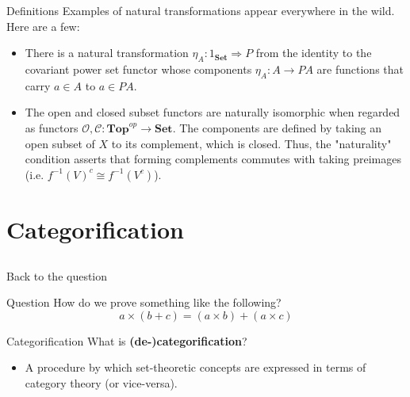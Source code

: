 \documentclass[tikz]{beamer}
\theoremstyle{definition}
\begin{document}
\begin{frame}{Definitions}
    Examples of natural transformations appear everywhere in the wild. Here are a few: 
    
    \begin{itemize}
        \item There is a natural transformation $\eta_A : 1_{\mathbf{Set}} \Rightarrow P$ from the identity to the covariant power set functor whose components $\eta_A : A \to PA$ are functions that carry $a \in A$ to ${a} \in PA$.
        
        \item The open and closed subset functors are naturally isomorphic when regarded as functors $\mathcal{O},\mathcal{C}: \mathbf{Top}^{op} \to \mathbf{Set}$. The components are defined by taking an open subset of $X$ to its complement, which is closed. Thus, the "naturality" condition asserts that forming complements commutes with taking preimages (i.e. $f^{-1}(V)^c \cong f^{-1}(V^c)$).
    \end{itemize}{}
\end{frame}{}

\section{Categorification}
\subsection{}

\begin{frame}{Back to the question}

\begin{block}{Question}
How do we prove something like the following? 
\begin{equation*}
     a \times (b + c) = (a \times b) + (a \times c)
\end{equation*}
\end{block}
\end{frame}{}

\begin{frame}{Categorification}
    What is \textbf{(de-)categorification}?
    
    \begin{itemize}
        \item A procedure by which set-theoretic concepts are expressed in terms of category theory (or vice-versa).
    \end{itemize}
\end{frame}{}
\end{document}
